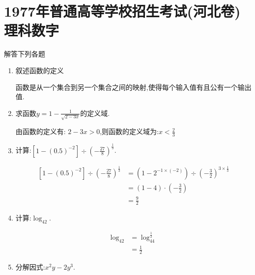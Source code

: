 \section[1977年高考数学试卷及答案(河北卷)理科]{1977年普通高等学校招生考试(河北卷)\\\Huge{理科数字}}

\begin{questions}
	\question 解答下列各题
	\begin{enumerate}[label=(\arabic*)]
		\item 叙述函数的定义
		      \begin{solution}
			      函数是从一个集合到另一个集合之间的映射,使得每个输入值有且公有一个输出值.
		      \end{solution}
		\item 求函数$y=1-\frac{1}{\sqrt{2-3x}}$的定义域.
		      \begin{solution}
			      由函数的定义有:
			      \begin{math}
				      2-3x > 0
			      \end{math},则函数的定义域为:$x<\frac23$
		      \end{solution}
		\item 计算:$\left[1-(0.5)^{-2}\right] \div \left(-\frac{27}{8}\right)^{\frac13}$.
		      \begin{solution}
			      \begin{align*}
				      \left[1-(0.5)^{-2}\right] \div \left(-\frac{27}{8}\right)^{\frac13} & = \left(1-2^{-1\times (-2)}\right)
				      \div \left(-\frac32\right)^{3\times\frac13}                                                              \\
				                                                                          & = (1 - 4) \cdot (-\frac32)         \\
				                                                                          & = \frac92
			      \end{align*}
		      \end{solution}
		\item 计算:$\log_42$.
		      \begin{solution}
			      \begin{align*}
				      \log_42 & = \log_44^\frac12 \\
				              & = \frac12
			      \end{align*}
		      \end{solution}
		\item 分解因式:$x^2y - 2y^3$.
		      \begin{solution}

\end{solution}
\end{enumerate}
\end{questions}
